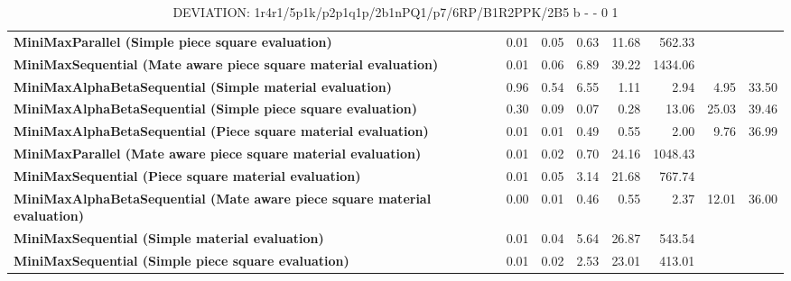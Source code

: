 \begin{table}[H]
{\begin{tabular}{|p{8cm}|*{7}{r|}}
\rowcolor[HTML]{FFFFFF}
\textbf{MiniMaxParallel (Simple piece square evaluation)}               & 0.01 & 0.05 & 0.63 & 11.68 & 562.33 &  &  \\

\rowcolor[HTML]{EFEFEF}
\textbf{MiniMaxSequential (Mate aware piece square material evaluation)}               & 0.01 & 0.06 & 6.89 & 39.22 & 1434.06 &  &  \\

\rowcolor[HTML]{FFFFFF}
\textbf{MiniMaxAlphaBetaSequential (Simple material evaluation)}               & 0.96 & 0.54 & 6.55 & 1.11 & 2.94 & 4.95 & 33.50 \\

\rowcolor[HTML]{EFEFEF}
\textbf{MiniMaxAlphaBetaSequential (Simple piece square evaluation)}               & 0.30 & 0.09 & 0.07 & 0.28 & 13.06 & 25.03 & 39.46 \\

\rowcolor[HTML]{FFFFFF}
\textbf{MiniMaxAlphaBetaSequential (Piece square material evaluation)}               & 0.01 & 0.01 & 0.49 & 0.55 & 2.00 & 9.76 & 36.99 \\

\rowcolor[HTML]{EFEFEF}
\textbf{MiniMaxParallel (Mate aware piece square material evaluation)}               & 0.01 & 0.02 & 0.70 & 24.16 & 1048.43 &  &  \\

\rowcolor[HTML]{FFFFFF}
\textbf{MiniMaxSequential (Piece square material evaluation)}               & 0.01 & 0.05 & 3.14 & 21.68 & 767.74 &  &  \\

\rowcolor[HTML]{EFEFEF}
\textbf{MiniMaxAlphaBetaSequential (Mate aware piece square material evaluation)}               & 0.00 & 0.01 & 0.46 & 0.55 & 2.37 & 12.01 & 36.00 \\

\rowcolor[HTML]{FFFFFF}
\textbf{MiniMaxSequential (Simple material evaluation)}               & 0.01 & 0.04 & 5.64 & 26.87 & 543.54 &  &  \\

\rowcolor[HTML]{EFEFEF}
\textbf{MiniMaxSequential (Simple piece square evaluation)}               & 0.01 & 0.02 & 2.53 & 23.01 & 413.01 &  &  \\

            \hline
        \end{tabular}%
    }
    \caption{DEVIATION: 1r4r1/5p1k/p2p1q1p/2b1nPQ1/p7/6RP/B1R2PPK/2B5 b - - 0 1}
    \label{tab:complex-position-with-many-options-deviation}
\end{table}
